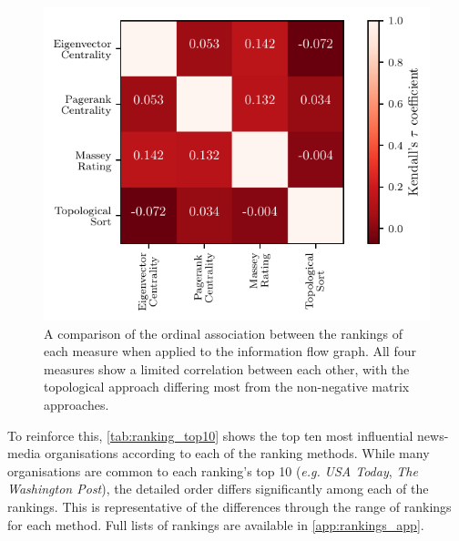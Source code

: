 \begin{figure}[!htbp]
\centering
\includegraphics{chapter4/figs/compare_methods.pdf}
\caption{A comparison of the ordinal association between the rankings of each measure when applied to the information flow graph. All four measures show a limited correlation between each other, with the topological approach differing most from the non-negative matrix approaches.}\label{fig:rank_comparison}
\end{figure}

To reinforce this, \autoref{tab:ranking_top10} shows the top ten most influential news-media organisations according to each of the ranking methods. While many organisations are common to each ranking's top 10 (\emph{e.g.} \emph{USA Today}, \emph{The Washington Post}), the detailed order differs significantly among each of the rankings. This is representative of the differences through the range of rankings for each method. Full lists of rankings are available in \autoref{app:rankings_app}.


